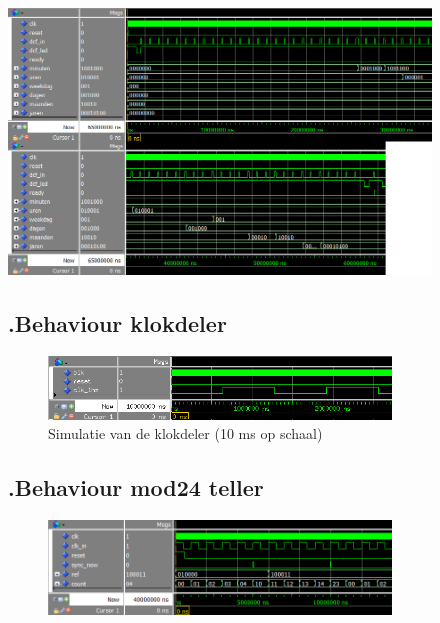 \begin{figure}[ht!]
\includegraphics[width=\textwidth,height=\textheight,keepaspectratio]{Figuren/DCF77/Synctime.png}
\caption{Simulatie van synctime (65 ms op schaal)}
\subsection*{\label{fig: klokdeler_beh}\thesubsection.\quad Behaviour klokdeler}
\begin{figure}[ht!]
\includegraphics[width=\textwidth,height=\textheight,keepaspectratio]{Figuren/DCF77/Klokdeler.png}
\caption{Simulatie van de  klokdeler (10 ms op schaal)}
\end{figure}
\subsection*{\label{fig: mod24_beh}\thesubsection.\quad Behaviour mod24 teller}
\begin{figure}[ht!]
\includegraphics[width=\textwidth,height=\textheight,keepaspectratio]{Figuren/DCF77/Mod24_teller.png}

\end{figure}
\end{figure}
